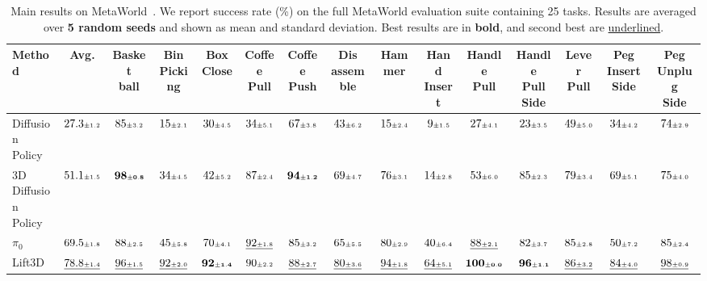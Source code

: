 \begin{table}[t]
\centering
\caption{Main results on MetaWorld~\cite{Yu2020Meta,mclean2025metaworld}. We report success rate (\%) on the full MetaWorld evaluation suite containing 25 tasks. Results are averaged over \textbf{5 random seeds} and shown as mean and standard deviation. Best results are in \textbf{bold}, and second best are \underline{underlined}.}
\label{tab:main_results_metaworld}
\scriptsize
\setlength{\tabcolsep}{2pt}
\begin{adjustbox}{max width=\textwidth}
\begin{tabular}{l|c|ccccccccccccc}
\toprule
\rowcolor{tablehead}
Method & Avg. &
\shortstack{Basket\\ball} &
\shortstack{Bin\\Picking} &
\shortstack{Box\\Close} &
\shortstack{Coffee\\Pull} &
\shortstack{Coffee\\Push} &
\shortstack{Dis\\assemble} &
Hammer &
\shortstack{Hand\\Insert} &
\shortstack{Handle\\Pull} &
\shortstack{Handle\\Pull Side} &
\shortstack{Lever\\Pull} &
\shortstack{Peg Insert\\Side} &
\shortstack{Peg Unplug\\Side} \\
\midrule
Diffusion Policy~\cite{chi2024diffusionpolicy} & $27.3{\scriptscriptstyle\pm 1.2}$ & $85{\scriptscriptstyle\pm 3.2}$ & $15{\scriptscriptstyle\pm 2.1}$ & $30{\scriptscriptstyle\pm 4.5}$ & $34{\scriptscriptstyle\pm 5.1}$ & $67{\scriptscriptstyle\pm 3.8}$ & $43{\scriptscriptstyle\pm 6.2}$ & $15{\scriptscriptstyle\pm 2.4}$ & $9{\scriptscriptstyle\pm 1.5}$ & $27{\scriptscriptstyle\pm 4.1}$ & $23{\scriptscriptstyle\pm 3.5}$ & $49{\scriptscriptstyle\pm 5.0}$ & $34{\scriptscriptstyle\pm 4.2}$ & $74{\scriptscriptstyle\pm 2.9}$ \\
3D Diffusion Policy~\cite{Ze2024DP3} & $51.1{\scriptscriptstyle\pm 1.5}$ & $\mathbf{98{\scriptscriptstyle\pm 0.8}}$ & $34{\scriptscriptstyle\pm 4.5}$ & $42{\scriptscriptstyle\pm 5.2}$ & $87{\scriptscriptstyle\pm 2.4}$ & $\mathbf{94{\scriptscriptstyle\pm 1.2}}$ & $69{\scriptscriptstyle\pm 4.7}$ & $76{\scriptscriptstyle\pm 3.1}$ & $14{\scriptscriptstyle\pm 2.8}$ & $53{\scriptscriptstyle\pm 6.0}$ & $85{\scriptscriptstyle\pm 2.3}$ & $79{\scriptscriptstyle\pm 3.4}$ & $69{\scriptscriptstyle\pm 5.1}$ & $75{\scriptscriptstyle\pm 4.0}$ \\
$\pi_0$~\cite{black2026pi0visionlanguageactionflowmodel} & $69.5{\scriptscriptstyle\pm 1.8}$ & $88{\scriptscriptstyle\pm 2.5}$ & $45{\scriptscriptstyle\pm 5.8}$ & $70{\scriptscriptstyle\pm 4.1}$ & $\underline{92{\scriptscriptstyle\pm 1.8}}$ & $85{\scriptscriptstyle\pm 3.2}$ & $65{\scriptscriptstyle\pm 5.5}$ & $80{\scriptscriptstyle\pm 2.9}$ & $40{\scriptscriptstyle\pm 6.4}$ & $\underline{88{\scriptscriptstyle\pm 2.1}}$ & $82{\scriptscriptstyle\pm 3.7}$ & $85{\scriptscriptstyle\pm 2.8}$ & $50{\scriptscriptstyle\pm 7.2}$ & $85{\scriptscriptstyle\pm 2.4}$ \\
Lift3D~\cite{Jia_2025_CVPR} & $\underline{78.8{\scriptscriptstyle\pm 1.4}}$ & $\underline{96{\scriptscriptstyle\pm 1.5}}$ & $\underline{92{\scriptscriptstyle\pm 2.0}}$ & $\mathbf{92{\scriptscriptstyle\pm 1.4}}$ & $90{\scriptscriptstyle\pm 2.2}$ & $\underline{88{\scriptscriptstyle\pm 2.7}}$ & $\underline{80{\scriptscriptstyle\pm 3.6}}$ & $\underline{94{\scriptscriptstyle\pm 1.8}}$ & $\underline{64{\scriptscriptstyle\pm 5.1}}$ & $\mathbf{100{\scriptscriptstyle\pm 0.0}}$ & $\mathbf{96{\scriptscriptstyle\pm 1.1}}$ & $\underline{86{\scriptscriptstyle\pm 3.2}}$ & $\underline{84{\scriptscriptstyle\pm 4.0}}$ & $\underline{98{\scriptscriptstyle\pm 0.9}}$ \\

\end{tabular}
\end{adjustbox}
\end{table}
